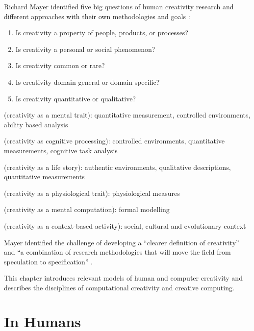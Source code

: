 Richard Mayer identified five big questions of human creativity research and different approaches with their own methodologies and goals \autocite*{Mayer1999}:

\label{s:Mayer5questions}
\begin{enumerate}
  \item Is creativity a property of people, products, or processes?
  \item Is creativity a personal or social phenomenon?
  \item Is creativity common or rare?
  \item Is creativity domain-general or domain-specific?
  \item Is creativity quantitative or qualitative?
\end{enumerate}

\begin{description}[leftmargin=3.5cm]
  \item [Psychometric] (creativity as a mental trait): quantitative measurement, controlled environments, ability based analysis
  \item [Psychological] (creativity as cognitive processing): controlled environments, quantitative measurements, cognitive task analysis
  \item [Biographical] (creativity as a life story): authentic environments, qualitative descriptions, quantitative measurements
  \item [Biological] (creativity as a physiological trait): physiological measures
  \item [Computational] (creativity as a mental computation): formal modelling
  \item [Contextual] (creativity as a context-based activity): social, cultural and evolutionary context
\end{description}

Mayer identified the challenge of developing a ``clearer definition of creativity'' and ``a combination of research methodologies that will move the field from speculation to specification'' \autocite*{Mayer1999}.

This chapter introduces relevant models of human and computer creativity and describes the disciplines of computational creativity and creative computing.


\section{In Humans}
\label{s:humancreativity}

